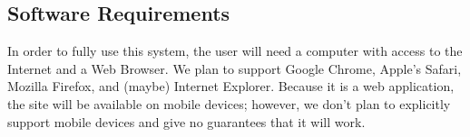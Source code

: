 \subsection{Software Requirements}
\iffalse
List and describe what hardware and/or software you will need to successfully install and use your software.
\fi

In order to fully use this system, the user will need a computer with access to the Internet and a Web Browser. We plan to support Google Chrome, Apple's Safari, Mozilla Firefox, and (maybe) Internet Explorer. Because it is a web application, the site will be available on mobile devices; however, we don't plan to explicitly support mobile devices and give no guarantees that it will work.